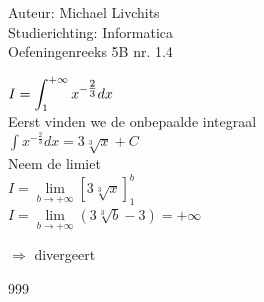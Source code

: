 \documentclass[a4paper]{article}
\newcommand{\dint}{\displaystyle\int}
\begin{document}
  
\noindent \large Auteur: Michael Livchits \\
\noindent \large Studierichting: Informatica\\
\noindent \large Oefeningenreeks 5B nr. 1.4\\

\medskip

\normalsize

$I = \displaystyle\dint_{1}^{+\infty} x^{-\tfrac{2}{3}}dx$\\

Eerst vinden we de onbepaalde integraal\\

$\displaystyle\int x^{-\tfrac{2}{3}}dx = 3\sqrt[3]{x} + C$\\

Neem de limiet\\

$I = \lim\limits_{b\rightarrow +\infty}\left[3\sqrt[3]{x}\right]_{1}^{b}$\\

$I = \lim\limits_{b\rightarrow +\infty}\left(3\sqrt[3]{b} - 3\right) = + \infty$

$\Rightarrow$ divergeert\\

\begin{thebibliography}{999}
\end{thebibliography}
\end{document}
